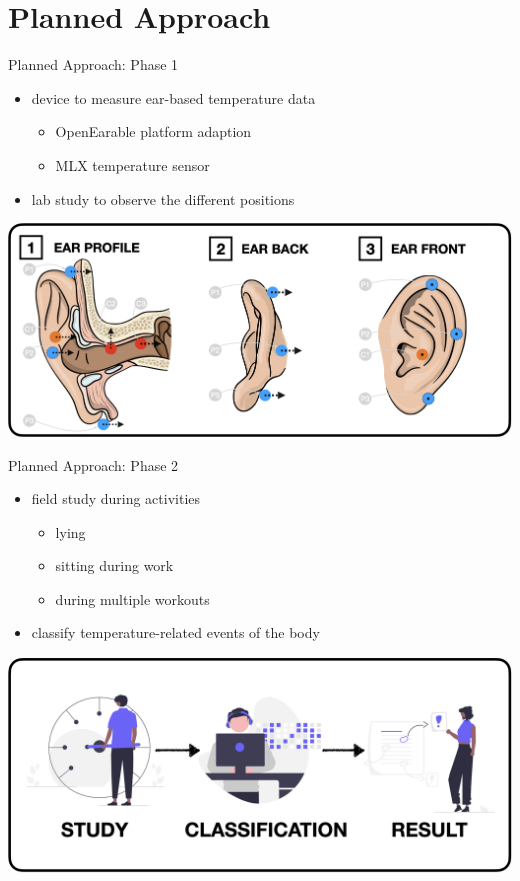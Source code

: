 \documentclass[en]{sdqbeamer}
\begin{document}
\section{Planned Approach}
\begin{frame}{Planned Approach: Phase 1}
    \begin{itemize}
        \item device to measure ear-based temperature data
        \begin{itemize}
            \item OpenEarable platform adaption
            \item MLX temperature sensor
        \end{itemize}
        \item lab study to observe the different positions
    \end{itemize}
    \begin{center}
        \includegraphics[scale=0.17]{../thesis-doc/images/ear_measurement_points/emp.png}    
    \end{center}
\end{frame}

\begin{frame}{Planned Approach: Phase 2}
    \begin{itemize}
        \item field study during activities
        \begin{itemize}
            \item lying
            \item sitting during work
            \item during multiple workouts
        \end{itemize}
        \item classify temperature-related events of the body
    \end{itemize}
    \begin{center}
        \includegraphics[scale=0.17]{proposal-presentation/images/analytics.png}    
    \end{center}
\end{frame}
\end{document}
